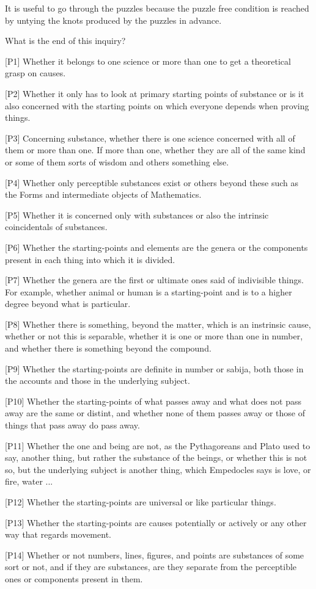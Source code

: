 It is useful to go through the puzzles because the puzzle free condition
is reached by untying the knots produced by the puzzles in advance.

What is the end of this inquiry?

[P1] Whether it belongs to one science or more than one to get
a theoretical grasp on causes.

[P2] Whether it only has to look at primary starting points of substance
or is it also concerned with the starting points on which everyone depends
when proving things.

[P3] Concerning substance, whether there is one science concerned with all of them
or more than one. If more than one, whether they are all of the same kind
or some of them sorts of wisdom and others something else.

[P4] Whether only perceptible substances exist or others beyond these such as the
Forms and intermediate objects of Mathematics.

[P5] Whether it is concerned only with substances or also the 
intrinsic coincidentals of substances.

[P6] Whether the starting-points and elements are the genera
or the components present in each thing into which it is divided.

[P7] Whether the genera are the first or ultimate ones said of indivisible things.
For example, whether animal or human is a starting-point
and is to a higher degree beyond what is particular.

[P8] Whether there is something, beyond the matter, which is an instrinsic cause,
whether or not this is separable, whether it is one or more than one in number,
and whether there is something beyond the compound.

[P9] Whether the starting-points are definite in number or sabija,
both those in the accounts and those in the underlying subject.

[P10] Whether the starting-points of what passes away and what does not pass away are the same or distint,
and whether none of them passes away or those of things that pass away do pass away. 

[P11] Whether the one and being are not, as the Pythagoreans and Plato used to say,
another thing, but rather the substance of the beings, or whether this is not so,
but the underlying subject is another thing, which Empedocles says is love, or fire, water ...

[P12] Whether the starting-points are universal or like particular things.

[P13] Whether the starting-points are causes potentially or actively or any other way that regards movement.

[P14] Whether or not numbers, lines, figures, and points are substances of some sort or not,
and if they are substances, are they separate from the perceptible ones or components present in them.
